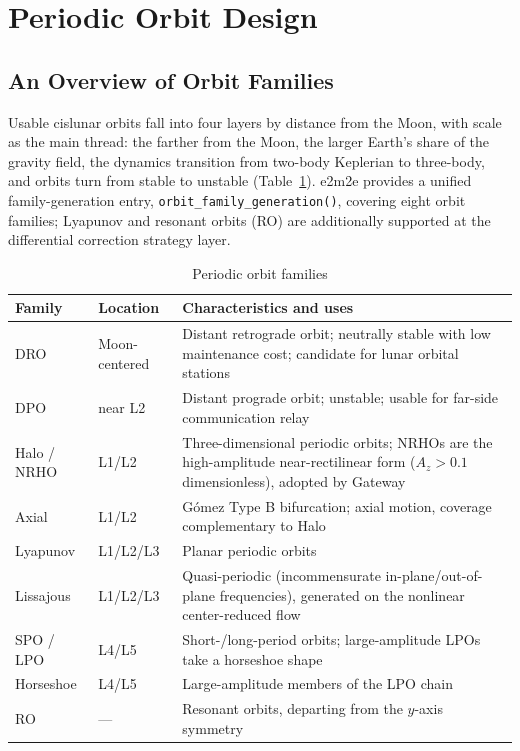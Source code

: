 \section{Periodic Orbit Design}
\label{sec:orbit}

\subsection{An Overview of Orbit Families}

Usable cislunar orbits fall into four layers by distance from the Moon, with
scale as the main thread: the farther from the Moon, the larger Earth's share
of the gravity field, the dynamics transition from two-body Keplerian to
three-body, and orbits turn from stable to unstable
(Table~\ref{tab:families}). e2m2e provides a unified family-generation entry,
\texttt{orbit\_family\_generation()}, covering eight orbit families; Lyapunov
and resonant orbits (RO) are additionally supported at the differential
correction strategy layer.

\begin{table}[htbp]
\centering\small
\caption{Periodic orbit families}
\label{tab:families}
\begin{tabularx}{\textwidth}{@{}llX@{}}
\toprule
\textbf{Family} & \textbf{Location} & \textbf{Characteristics and uses} \\
\midrule
DRO & Moon-centered & Distant retrograde orbit; neutrally stable with low
maintenance cost; candidate for lunar orbital stations \\
DPO & near L2 & Distant prograde orbit; unstable; usable for far-side
communication relay \\
Halo / NRHO & L1/L2 & Three-dimensional periodic orbits; NRHOs are the
high-amplitude near-rectilinear form ($A_z > 0.1$ dimensionless), adopted by
Gateway \\
Axial & L1/L2 & G\'omez Type B bifurcation; axial motion, coverage
complementary to Halo \\
Lyapunov & L1/L2/L3 & Planar periodic orbits \\
Lissajous & L1/L2/L3 & Quasi-periodic (incommensurate in-plane/out-of-plane
frequencies), generated on the nonlinear center-reduced flow \\
SPO / LPO & L4/L5 & Short-/long-period orbits; large-amplitude LPOs take a
horseshoe shape \\
Horseshoe & L4/L5 & Large-amplitude members of the LPO chain \\
RO & --- & Resonant orbits, departing from the $y$-axis symmetry \\
\bottomrule
\end{tabularx}
\end{table}

